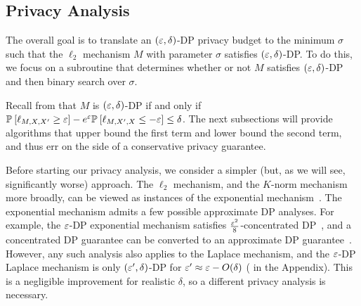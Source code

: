 \subsection{Privacy Analysis}
\label{subsec:l2_dp}
The overall goal is to translate an $(\varepsilon, \delta)$-DP privacy budget to the minimum $\sigma$ such that the $\ell_2$ mechanism $M$ with parameter $\sigma$ satisfies $(\varepsilon, \delta)$-DP. To do this, we focus on a subroutine that determines whether or not $M$ satisfies $(\varepsilon, \delta)$-DP and then binary search over $\sigma$.

Recall from  that $M$ is $(\varepsilon, \delta)$-DP if and only if $\mathbb{P}_{}\left[\ell_{M,X,X'} \geq \varepsilon\right] - e^\varepsilon\mathbb{P}_{}\left[\ell_{M,X',X}  \leq -\varepsilon\right] \leq \delta$. The next subsections will provide algorithms that upper bound the first term and lower bound the second term, and thus err on the side of a conservative privacy guarantee.

Before starting our privacy analysis, we consider a simpler (but, as we will see, significantly worse) approach. The $\ell_2$ mechanism, and the $K$-norm mechanism more broadly, can be viewed as instances of the exponential mechanism~\cite{MT07}. The exponential mechanism admits a few possible approximate DP analyses. For example, the $\varepsilon$-DP exponential mechanism satisfies $\frac{\varepsilon^2}{8}$-concentrated DP~\cite{CR21}, and a concentrated DP guarantee can be converted to an approximate DP guarantee~\cite{BS16, CKS20, ALCKS20, ZDW22}. However, any such analysis also applies to the Laplace mechanism, and the $\varepsilon$-DP Laplace mechanism is only $(\varepsilon', \delta)$-DP for $\varepsilon' \approx \varepsilon - O(\delta)$ ( in the Appendix). This is a negligible improvement for realistic $\delta$, so a different privacy analysis is necessary.

